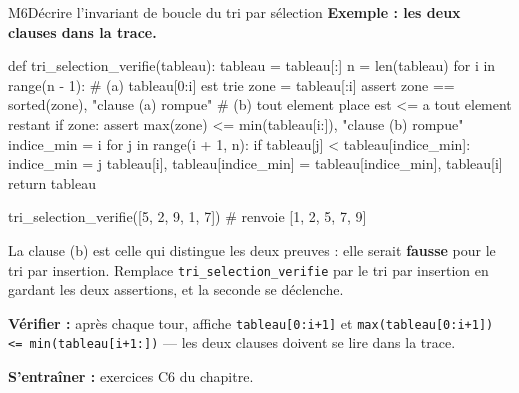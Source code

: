 \begin{fichemethode}{M6}{Décrire l'invariant de boucle du tri par sélection}
\textbf{Exemple : les deux clauses dans la trace.}
\begin{python}
def tri_selection_verifie(tableau):
    tableau = tableau[:]
    n = len(tableau)
    for i in range(n - 1):
        # (a) tableau[0:i] est trie
        zone = tableau[:i]
        assert zone == sorted(zone), "clause (a) rompue"
        # (b) tout element place est <= a tout element restant
        if zone:
            assert max(zone) <= min(tableau[i:]), "clause (b) rompue"
        indice_min = i
        for j in range(i + 1, n):
            if tableau[j] < tableau[indice_min]:
                indice_min = j
        tableau[i], tableau[indice_min] = tableau[indice_min], tableau[i]
    return tableau

tri_selection_verifie([5, 2, 9, 1, 7])   # renvoie [1, 2, 5, 7, 9]
\end{python}
La clause (b) est celle qui distingue les deux preuves : elle serait \textbf{fausse} pour
le tri par insertion. Remplace \lstinline{tri_selection_verifie} par le tri par insertion
en gardant les deux assertions, et la seconde se déclenche.

\textbf{Vérifier :} après chaque tour, affiche \lstinline{tableau[0:i+1]} et
\lstinline{max(tableau[0:i+1]) <= min(tableau[i+1:])} — les deux clauses doivent se lire
dans la trace.

\textbf{S'entraîner :} exercices C6 du chapitre.
\end{fichemethode}
